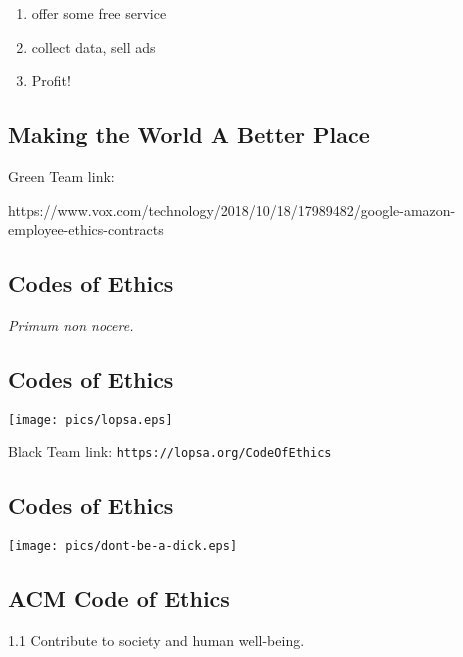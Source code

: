\documentclass[xga]{xdvislides}
\begin{document}
\vspace*{\fill}
\begin{enumerate}
	\item offer some free service
	\item collect data, sell ads
	\item Profit!
\end{enumerate}
\vspace*{\fill}

\subsection{Making the World A Better Place}
Green Team link:

https://www.vox.com/technology/2018/10/18/17989482/google-amazon-employee-ethics-contracts

\subsection{Codes of Ethics}
\Huge
\vspace*{\fill}
\begin{center}
	{\em Primum non nocere.}
\end{center}
\vspace*{\fill}
\Normalsize

\subsection{Codes of Ethics}
\vspace*{\fill}
\begin{center}
	\texttt{[image: pics/lopsa.eps]}
\end{center}
Black Team link: \verb+https://lopsa.org/CodeOfEthics+
\vspace*{\fill}

\subsection{Codes of Ethics}
\vspace*{\fill}
\begin{center}
	\texttt{[image: pics/dont-be-a-dick.eps]}
\end{center}
\vspace*{\fill}

\subsection{ACM Code of Ethics}
\Huge
\vspace*{\fill}
\begin{center}
1.1 Contribute to society and human well-being.
\end{center}
\vspace*{\fill}
\Normalsize
\end{document}
